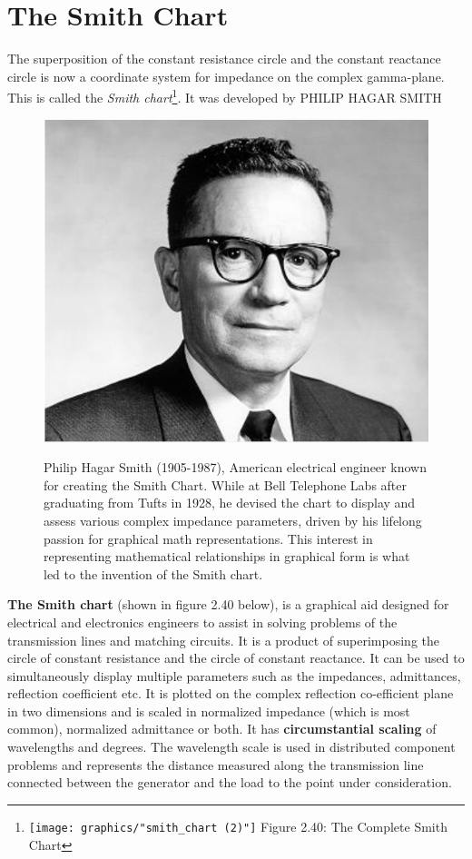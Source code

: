 \section{The Smith Chart}
The superposition of the constant resistance circle and the constant reactance circle is now a coordinate system for impedance on the complex gamma-plane. This is called the \emph{Smith chart}\footnote{
\centering
\texttt{[image: graphics/"smith\_chart (2)"]}
\centering
Figure 2.40: The Complete Smith Chart
}. It was developed by PHILIP HAGAR SMITH
\begin{figure}[h]
\includegraphics[scale=0.09]{graphics/a21}


Philip Hagar Smith (1905-1987), American electrical engineer known for creating the Smith Chart. While at Bell Telephone Labs after graduating from Tufts in 1928, he devised the chart to display and assess various complex impedance parameters, driven by his lifelong passion for graphical math representations. This interest in representing mathematical relationships in graphical form is what led to the invention of the Smith chart.
\label{fig:smithchart-2}
\end{figure}

\textbf{The Smith chart} (shown in figure 2.40 below), is a graphical aid designed for electrical and electronics engineers to assist in solving problems of the transmission lines and matching circuits. It is a product of superimposing the circle of constant resistance and the circle of constant reactance. It can be used to simultaneously display multiple parameters such as the impedances, admittances, reflection coefficient etc.
It is plotted on the complex reflection co-efficient plane in two dimensions and is scaled in normalized impedance (which is most common), normalized admittance or both. It has \textbf{circumstantial scaling} of wavelengths and degrees. The wavelength scale is used in distributed component problems and represents the distance measured along the transmission line connected between the generator and the load to the point under consideration.

